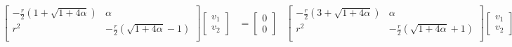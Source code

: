 \documentclass{article}
\begin{document}
\begin{solution}
\begin{align*}
\begin{bmatrix}
-\frac{r}{2} \left( 1 + \sqrt{1 + 4\alpha}\right)	&	\alpha		\\
r^{2}														&	-\frac{r}{2}\left( \sqrt{1 + 4\alpha} - 1\right)	\\
\end{bmatrix}
\begin{bmatrix}
v_{1}\\
v_{2}
\end{bmatrix}
&=
\begin{bmatrix}
0\\
0
\end{bmatrix}
&
\begin{bmatrix}
-\frac{r}{2} \left( 3 + \sqrt{1 + 4\alpha}\right)	&	\alpha		\\
r^{2}														&	-\frac{r}{2}\left( \sqrt{1 + 4\alpha} + 1\right)	\\
\end{bmatrix}
\begin{bmatrix}
v_{1}\\
v_{2}
\end{bmatrix}
&=
\begin{bmatrix}
0\\
0
\end{bmatrix}
\\
\end{align*}


\end{solution}
\end{document}
